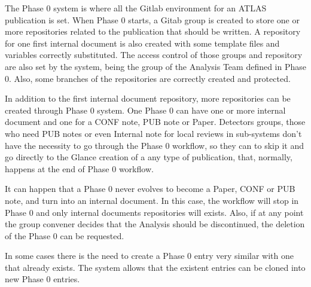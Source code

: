 The Phase 0 system is where all the Gitlab environment for an ATLAS publication is set. When Phase 0 starts, a Gitab group is created to store one or more repositories related to the publication that should be written. A repository for one first internal document is also created with some template files and variables correctly substituted. The access control of those groups and repository are also set by the system, being the group of the Analysis Team defined in Phase 0. Also, some branches of the repositories are correctly created and protected.

In addition to the first internal document repository, more repositories can be created through Phase 0 system. One Phase 0 can have one or more internal document and one for a CONF note, PUB note or Paper. Detectors groups, those who need PUB notes or even Internal note for local reviews in sub-systems don’t have the necessity to go through the Phase 0 workflow, so they can to skip it and go directly to the Glance creation of a any type of publication, that, normally, happens at the end of Phase 0 workflow.

It can happen that a Phase 0 never evolves to become a Paper, CONF or PUB note, and turn into an internal document. In this case, the workflow will stop in Phase 0 and only internal documents repositories will exists. Also, if at any point the group convener decides that the Analysis should be discontinued, the deletion of the Phase 0 can be requested.

In some cases there is the need to create a Phase 0 entry very similar with one that already exists. The system allows that the existent entries can be cloned into new Phase 0 entries.
